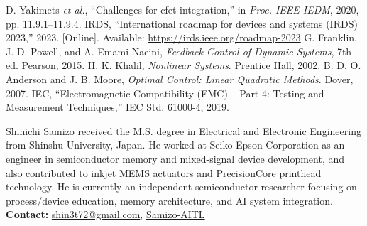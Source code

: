 \documentclass[conference]{IEEEtran}
\begin{document}
\begin{thebibliography}{1}
D. Yakimets \emph{et al.}, ``Challenges for cfet integration,'' in \emph{Proc. IEEE IEDM}, 2020, pp. 11.9.1--11.9.4.
IRDS, ``International roadmap for devices and systems (IRDS) 2023,'' 2023. [Online]. Available: \url{https://irds.ieee.org/roadmap-2023}
G. Franklin, J. D. Powell, and A. Emami-Naeini, \emph{Feedback Control of Dynamic Systems}, 7th ed. Pearson, 2015.
H. K. Khalil, \emph{Nonlinear Systems}. Prentice Hall, 2002.
B. D. O. Anderson and J. B. Moore, \emph{Optimal Control: Linear Quadratic Methods}. Dover, 2007.
IEC, ``Electromagnetic Compatibility (EMC) -- Part 4: Testing and Measurement Techniques,'' IEC Std. 61000-4, 2019.
\end{thebibliography}

\begin{IEEEbiographynophoto}{Shinichi Samizo}
received the M.S. degree in Electrical and Electronic Engineering from Shinshu University, Japan.  
He worked at Seiko Epson Corporation as an engineer in semiconductor memory and mixed-signal device development, and also contributed to inkjet MEMS actuators and PrecisionCore printhead technology.  
He is currently an independent semiconductor researcher focusing on process/device education, memory architecture, and AI system integration.  
\textbf{Contact:} \href{mailto:shin3t72@gmail.com}{shin3t72@gmail.com}, \href{https://github.com/Samizo-AITL}{Samizo-AITL}
\end{IEEEbiographynophoto}
\end{document}
